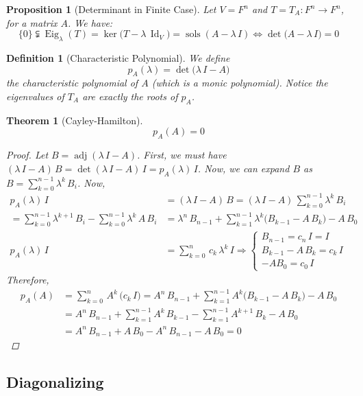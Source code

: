 \documentclass[12pt]{article}
\let\RA\Rightarrow
\let\LR\Leftrightarrow
\DeclareMathOperator{\sols}{sols}
\DeclareMathOperator{\Id}{Id}
\DeclareMathOperator{\adj}{adj}
\DeclareMathOperator{\Eig}{Eig}
\newtheorem{theorem}{Theorem}[subsection]
\newtheorem{definition}{Definition}[subsection]
\newtheorem{proposition}{Proposition}[subsection]
\begin{document}
\begin{proposition}[Determinant in Finite Case]
  Let $V=F^n$ and $T=T_A:F^n\to F^n$, for a matrix $A$. We have:
  $$
  \{0\}\subsetneqq\Eig_{\lambda}(T)=\ker\big(T-\lambda\,\Id_V\big)=\sols(A-\lambda\,I)\LR \det\big(A-\lambda\,I\big)=0
  $$
\end{proposition}

\begin{definition}[Characteristic Polynomial]
  We define $$p_A(\lambda)=\det\big(\lambda\,I-A\big)$$ the characteristic polynomial of $A$ (which is a monic polynomial). Notice the eigenvalues of $T_A$ are exactly the roots of $p_A$.
\end{definition}

\begin{theorem}[Cayley-Hamilton]
  $$p_A(A)=0$$
  \begin{proof}
    Let $B=\adj(\lambda\,I-A)$. First, we must have $(\lambda\,I-A)\,B=\det(\lambda\,I-A)\,I=p_A(\lambda)\,I$. Now, we can expand $B$ as $B=\sum_{k=0}^{n-1}\lambda^k\,B_i$. Now,
    \begin{align*}
      p_A(\lambda)\,I&=(\lambda\,I-A)\,B=(\lambda\,I-A)\,\sum_{k=0}^{n-1}\lambda^k\,B_i\\
      =\sum_{k=0}^{n-1}\lambda^{k+1}\,B_i-\sum_{k=0}^{n-1}\lambda^k\,A\,B_i
      &=\lambda^n\,B_{n-1}+\sum_{k=1}^{n-1}\lambda^k\big(B_{k-1}-A\,B_k\big)-A\,B_0\\
      p_A(\lambda)\,I&=\sum_{k=0}^n\,c_k\,\lambda^k\,I
      \RA
      \begin{cases}
        B_{n-1}=c_n\,I=I\\
        B_{k-1}-A\,B_k=c_k\,I\\
        -AB_0=c_0\,I
      \end{cases}
    \end{align*}
    Therefore,
    \begin{align*}
      p_A(A)&=\sum_{k=0}^n\,A^k\,\big(c_k\,I\big)=A^n\,B_{n-1}+\sum_{k=1}^{n-1}A^k\big(B_{k-1}-A\,B_k\big)-A\,B_0\\
      &=A^n\,B_{n-1}+\sum_{k=1}^{n-1}A^k\,B_{k-1}-\sum_{k=1}^{n-1}A^{k+1}\,B_k-A\,B_0\\
      &=A^n\,B_{n-1}+A\,B_0-A^n\,B_{n-1}-A\,B_0=0
    \end{align*}
  \end{proof}
\end{theorem}

\subsection{Diagonalizing}
\end{document}
